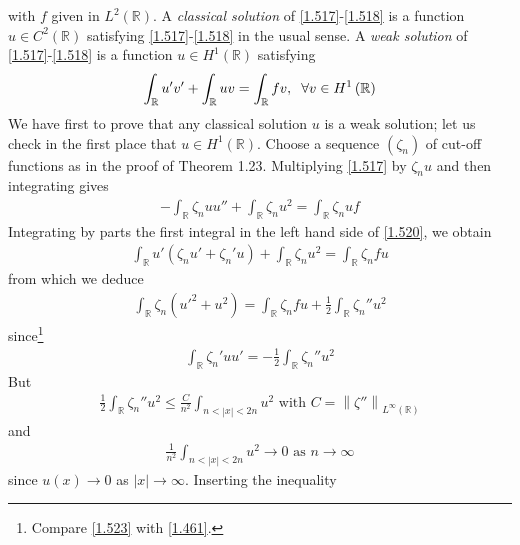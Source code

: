 \documentclass[a4paper,oneside]{article}
\numberwithin{equation}{section}
\begin{document}
with $f$ given in $L^2\left(\mathbb{R}\right)$. A \textit{classical solution} of \eqref{1.517}-\eqref{1.518} is a function $u\in C^2\left(\mathbb{R}\right)$ satisfying \eqref{1.517}-\eqref{1.518} in the usual sense. A \textit{weak solution} of \eqref{1.517}-\eqref{1.518} is a function $u\in H^1\left(\mathbb{R}\right)$ satisfying
\begin{align}
\int_{\mathbb{R}} {u'v'}  + \int_{\mathbb{R}} {uv}  = \int_{\mathbb{R}} {fv} ,\hspace{0.2cm}\forall v \in {H^1}\left( \mathbb{R} \right)
\end{align}
We have first to prove that any classical solution $u$ is a weak solution; let us check in the first place that $u\in H^1\left(\mathbb{R}\right)$. Choose a sequence $\left(\zeta _n\right)$ of cut-off functions as in the proof of Theorem 1.23. Multiplying \eqref{1.517} by $\zeta _n u$ and then integrating gives
\begin{align}
\label{1.520}
 - \int_{\mathbb{R}} {{\zeta _n}uu''}  + \int_{\mathbb{R}} {{\zeta _n}{u^2}}  = \int_{\mathbb{R}} {{\zeta _n}uf} 
\end{align}
Integrating by parts the first integral in the left hand side of \eqref{1.520}, we obtain
\begin{align}
\int_{\mathbb{R}} {u'\left( {{\zeta _n}u' + {\zeta _n}'u} \right)}  + \int_{\mathbb{R}} {{\zeta _n}{u^2}}  = \int_{\mathbb{R}} {{\zeta _n}fu} 
\end{align}
from which we deduce
\begin{align}
\label{1.522}
\int_{\mathbb{R}} {{\zeta _n}\left( {u{'^2} + {u^2}} \right)}  = \int_{\mathbb{R}} {{\zeta _n}fu}  + \frac{1}{2}\int_{\mathbb{R}} {{\zeta _n}''{u^2}} 
\end{align}
since\footnote{Compare \eqref{1.523} with \eqref{1.461}.}
\begin{align}
\label{1.523}
\int_{\mathbb{R}} {{\zeta _n}'uu'}  =  - \frac{1}{2}\int_{\mathbb{R}} {{\zeta _n}''{u^2}} 
\end{align}
But
\begin{align}
\frac{1}{2}\int_{\mathbb{R}} {{\zeta _n}''{u^2}}  \le \frac{C}{{{n^2}}}\int_{n < \left| x \right| < 2n} {{u^2}} \mbox{ with } C = {\left\| {\zeta ''} \right\|_{{L^\infty }\left( \mathbb{R} \right)}}
\end{align}
and 
\begin{align}
\frac{1}{{{n^2}}}\int_{n < \left| x \right| < 2n} {{u^2}}  \to 0\mbox{ as } n \to \infty 
\end{align}
since $u\left(x\right)\to 0$ as $\left| x \right| \to \infty $. Inserting the inequality
\end{document}
